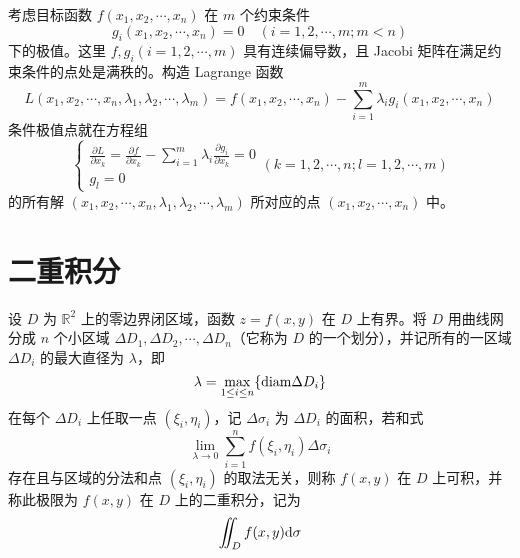 \documentclass{ctexbook}
\def\diff{\textnormal{d}}
\begin{document}
\begin{theorem}
    考虑目标函数 $f(x_1,x_2,\cdots,x_n)$ 在 $m$ 个约束条件
    \begin{equation}
        g_i(x_1,x_2,\cdots,x_n)=0\quad (i=1,2,\cdots,m; m<n)
    \end{equation}
    下的极值。这里 $f,g_i(i=1,2,\cdots,m)$ 具有连续偏导数，且 Jacobi 矩阵在满足约束条件的点处是满秩的。构造 Lagrange 函数
    \begin{equation}
        L(x_1,x_2,\cdots,x_n,\lambda_1,\lambda_2,\cdots,\lambda_m)=f(x_1,x_2,\cdots,x_n)-\sum_{i=1}^m\lambda_ig_i(x_1,x_2,\cdots,x_n)
    \end{equation}
    条件极值点就在方程组
    \begin{equation}
        \begin{cases}
            \frac{\partial L}{\partial x_k}=\frac{\partial f}{\partial x_k}-\sum_{i=1}^m\lambda_i\frac{\partial g_i}{\partial x_k}=0\\
            g_l=0
        \end{cases}
        (k=1,2,\cdots,n;l=1,2,\cdots,m)
    \end{equation}
    的所有解 $(x_1,x_2,\cdots,x_n,\lambda_1,\lambda_2,\cdots,\lambda_m)$ 所对应的点 $(x_1,x_2,\cdots,x_n)$ 中。
\end{theorem}

\chapter{二重积分}

\begin{definition}[二重积分]
    设 $D$ 为 $\mathbb{R}^2$ 上的零边界闭区域，函数 $z=f(x,y)$ 在 $D$ 上有界。将 $D$ 用曲线网分成 $n$ 个小区域 $\Delta D_1,\Delta D_2,\cdots,\Delta D_n$（它称为 $D$ 的一个划分），并记所有的一区域 $\Delta D_i$ 的最大直径为 $\lambda$，即
    \begin{equation}
        \lambda = \max_{1\leq i\leq n}\{\textnormal{diam}\Delta D_i\}
    \end{equation}
    在每个 $\Delta D_i$ 上任取一点 $(\xi_i, \eta_i)$，记 $\Delta\sigma_i$ 为 $\Delta D_i$ 的面积，若和式
    \begin{equation}
        \lim_{\lambda\rightarrow 0}\sum_{i=1}^n f(\xi_i,\eta_i)\Delta\sigma_i
    \end{equation}
    存在且与区域的分法和点 $(\xi_i,\eta_i)$ 的取法无关，则称 $f(x,y)$ 在 $D$ 上可积，并称此极限为 $f(x,y)$ 在 $D$ 上的二重积分，记为
    \begin{equation}
        \iint_D f(x,y)\diff\sigma
    \end{equation}
\end{definition}
\end{document}
